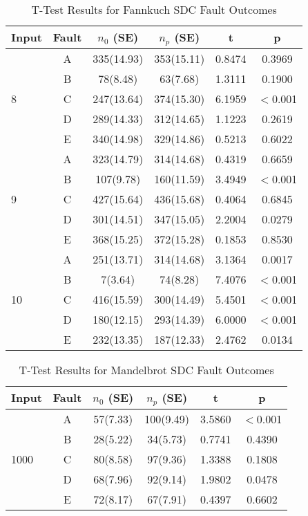 \begin{table}[htbp]
\small{
\begin{center}
    \begin{tabular}{|p{0.7cm}|c|c|c|c|c|}
    \hline
    \textbf{Input} & \textbf{Fault} & \textbf{$n_0$ (SE)} & \textbf{$n_p$ (SE)} & \textbf{t} & \textbf{p} \\ \hline
    \multirow{5}{*}{8}
    & A & 335(14.93) & 353(15.11) & 0.8474 & 0.3969 \\
	& B & 78(8.48) & 63(7.68) & 1.3111 &  0.1900 \\
 	& C & 247(13.64) & 374(15.30) & 6.1959 & $<$0.001 \\
 	& D & 289(14.33) & 312(14.65) & 1.1223 & 0.2619 \\
 	& E & 340(14.98) & 329(14.86) & 0.5213 & 0.6022 \\ \hline
    \multirow{5}{*}{9}
    & A & 323(14.79) & 314(14.68) & 0.4319 & 0.6659 \\
	& B & 107(9.78) & 160(11.59) & 3.4949 & $<$0.001 \\
 	& C & 427(15.64) & 436(15.68) & 0.4064 & 0.6845 \\
 	& D & 301(14.51) & 347(15.05) & 2.2004 & 0.0279 \\
 	& E & 368(15.25) & 372(15.28) & 0.1853 & 0.8530 \\ \hline
 	\multirow{5}{*}{10}
    & A & 251(13.71) & 314(14.68) & 3.1364 & 0.0017 \\
	& B & 7(3.64) & 74(8.28) & 7.4076 & $<$0.001 \\
 	& C & 416(15.59) & 300(14.49) & 5.4501 & $<$0.001 \\
 	& D & 180(12.15) & 293(14.39) & 6.0000 & $<$0.001 \\
 	& E & 232(13.35) & 187(12.33) & 2.4762 & 0.0134 \\ \hline
    \hline
    \end{tabular}
    \end{center}
    }
    \caption{T-Test Results for Fannkuch SDC Fault Outcomes}
    \label{tab:Fannkuch_TTest}
\end{table}

\begin{table}[htbp]
\small{
\begin{center}
    \begin{tabular}{|p{0.7cm}|c|c|c|c|c|}
    \hline
    \textbf{Input} & \textbf{Fault} & \textbf{$n_0$ (SE)} & \textbf{$n_p$ (SE)} & \textbf{t} & \textbf{p} \\ \hline
    \multirow{5}{*}{1000}
    & A & 57(7.33) & 100(9.49) & 3.5860 & $<$0.001 \\
	& B & 28(5.22) & 34(5.73) & 0.7741 &  0.4390 \\
 	& C & 80(8.58) & 97(9.36) & 1.3388 & 0.1808 \\
 	& D & 68(7.96) & 92(9.14) & 1.9802 & 0.0478 \\
 	& E & 72(8.17) & 67(7.91) & 0.4397 & 0.6602 \\ \hline
    \hline
    \end{tabular}
    \end{center}
    }
    \caption{T-Test Results for Mandelbrot SDC Fault Outcomes}
    \label{tab:Mandelbrot_TTest}
\end{table}

